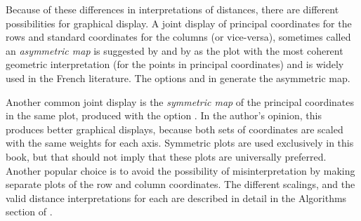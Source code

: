 Because of these differences in interpretations of distances, there
are different possibilities for graphical display.
A joint display of principal coordinates for the rows and standard
coordinates for the columns (or vice-versa), sometimes called
an \emph{asymmetric map} is suggested by
\citet{GreenacreHastie:87} and by \citet{Greenacre:89} as the plot
with the most coherent geometric interpretation
(for the points in principal coordinates) and is widely
used in the French literature.
The options  and 
in  generate the asymmetric map.

Another common joint display is the \emph{symmetric map} of the principal
coordinates in the same plot, produced with the option .
In the author's opinion, this produces better graphical displays, because
both sets of coordinates are scaled with the same weights for each axis.
Symmetric plots are used exclusively in this book, but that should
not imply that these plots are universally preferred.
Another popular choice is to avoid the possibility of misinterpretation
by making separate plots of the row and column coordinates.
The different scalings, and the valid distance interpretations for each
are described in detail in the Algorithms section of
.
